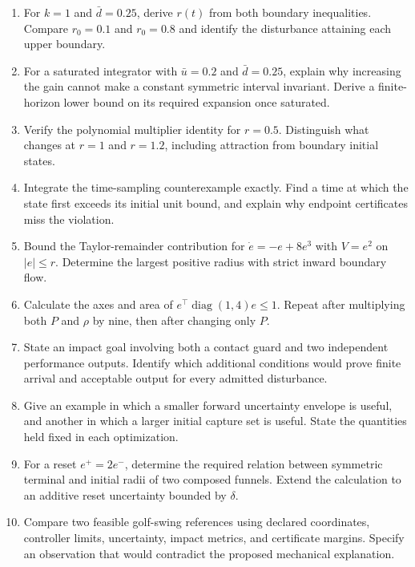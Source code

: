\documentclass[12pt, openany]{book}
\theoremstyle{plain}
\begin{document}
\begin{enumerate}[itemsep=0.25em,parsep=0pt]
\item For $k=1$ and $\bar d=0.25$, derive $r(t)$ from both boundary inequalities. Compare $r_0=0.1$ and $r_0=0.8$ and identify the disturbance attaining each upper boundary.
\item For a saturated integrator with $\bar u=0.2$ and $\bar d=0.25$, explain why increasing the gain cannot make a constant symmetric interval invariant. Derive a finite-horizon lower bound on its required expansion once saturated.
\item Verify the polynomial multiplier identity for $r=0.5$. Distinguish what changes at $r=1$ and $r=1.2$, including attraction from boundary initial states.
\item Integrate the time-sampling counterexample exactly. Find a time at which the state first exceeds its initial unit bound, and explain why endpoint certificates miss the violation.
\item Bound the Taylor-remainder contribution for $\dot e=-e+8e^3$ with $V=e^2$ on $|e|\leq r$. Determine the largest positive radius with strict inward boundary flow.
\item Calculate the axes and area of $e^\top\operatorname{diag}(1,4)e\leq1$. Repeat after multiplying both $P$ and $\rho$ by nine, then after changing only $P$.
\item State an impact goal involving both a contact guard and two independent performance outputs. Identify which additional conditions would prove finite arrival and acceptable output for every admitted disturbance.
\item Give an example in which a smaller forward uncertainty envelope is useful, and another in which a larger initial capture set is useful. State the quantities held fixed in each optimization.
\item For a reset $e^+=2e^-$, determine the required relation between symmetric terminal and initial radii of two composed funnels. Extend the calculation to an additive reset uncertainty bounded by $\delta$.
\item Compare two feasible golf-swing references using declared coordinates, controller limits, uncertainty, impact metrics, and certificate margins. Specify an observation that would contradict the proposed mechanical explanation.
\end{enumerate}
\end{document}
